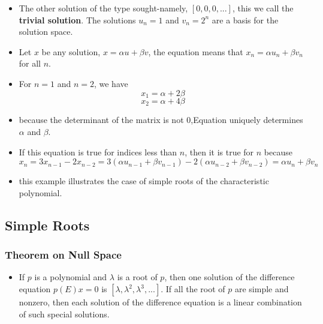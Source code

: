 \documentclass[notheorems,mathserif,table,compress]{beamer}  %
\begin{document}
\begin{frame}
\begin{itemize}
\item The other solution of the type sought-namely, $[0,0,0,...]$, this we call the  \textbf{trivial solution}. The solutions $u_{n}=1$ and $v_{n}=2^{n}$
are a basis for the solution space.
\item  Let $x$ be any solution, $x=\alpha u+\beta v$, the equation means that $x_{n}={\alpha u_{n}}+{\beta v_{n}}$ for all $n$.
\item For $n=1$ and $n=2$, we have 
\begin{displaymath}
x_{1}=\alpha+2\beta
\end{displaymath}
\begin{displaymath}
x_{2}=\alpha+4\beta
\end{displaymath} 
\item because the determinant of the matrix is not $0$,Equation uniquely determines $\alpha$ and $\beta$.
\end{itemize}
\end{frame}



\begin{frame}
\begin{itemize}
\item If this equation is true for indices less than $n$, then it is true for $n$ because 
\begin{displaymath}
x_{n}=3x_{n-1}-2x_{n-2}=3(\alpha u_{n-1}+\beta v_{n-1})-2(\alpha u_{n-2}+\beta v_{n-2})=\alpha u_{n}+\beta v_{n}
\end{displaymath}
\item this example illustrates the case of simple roots of the characteristic polynomial. 
\end{itemize}
\end{frame}

\subsection{Simple Roots}
\begin{frame}
\frametitle{Theorem on Null Space}
\begin{itemize}
\item 	If $p$ is a polynomial and $\lambda$ is a root of $p$, then one solution of the difference equation $p(E)x=0$ is $[\lambda, \lambda^{2}, \lambda^{3},...]$. If all the root of $p$ are simple and nonzero, then each solution of the difference equation is a linear combination of such special solutions.
\end{itemize}  
\end{frame}
\end{document}
